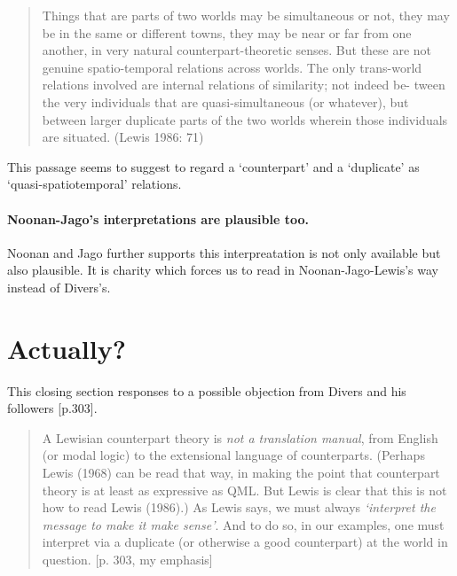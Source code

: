 \documentclass[
10pt, %
a4paper, %
twocolumn, %
landscape %
]{article}
\begin{document}
\begin{quotation}
  \noindent Things that are parts of two worlds may be simultaneous or not, they may be in the same or different towns, they may be near or far from one another, in very natural counterpart-theoretic senses. But these are not genuine spatio-temporal relations across worlds. The only trans-world relations involved are internal relations of similarity; not indeed be- tween the very individuals that are quasi-simultaneous (or whatever), but between larger duplicate parts of the two worlds wherein those individuals are situated. (Lewis 1986: 71)
\end{quotation}

This passage seems to suggest to regard a `counterpart' and a `duplicate' as `quasi-spatiotemporal' relations.

\paragraph{Noonan-Jago's interpretations are plausible too. }
Noonan and Jago further supports this interpreatation is not only available but also plausible. It is charity which forces us to read in Noonan-Jago-Lewis's way instead of Divers's.

\section{Actually?}
This closing section responses to a possible objection from Divers and his followers [p.303].

\begin{quotation}
A Lewisian counterpart theory is \emph{not a translation manual}, from English
(or modal logic) to the extensional language of counterparts. (Perhaps Lewis (1968) can be read that way, in making the point that counterpart theory is at least as expressive as QML. But Lewis is clear that this is not how to read Lewis (1986).) As Lewis says, we must always \emph{‘interpret the message to make it make sense’}. And to do so, in our examples, one must interpret via a duplicate (or otherwise a good counterpart) at the world in question.
[p. 303, my emphasis]
\end{quotation}




\end{document}

